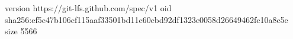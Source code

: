 version https://git-lfs.github.com/spec/v1
oid sha256:ef5c47b106cf115aaf33501bd11c60cbd92df1323e0058d26649462fc10a8c5e
size 5566
